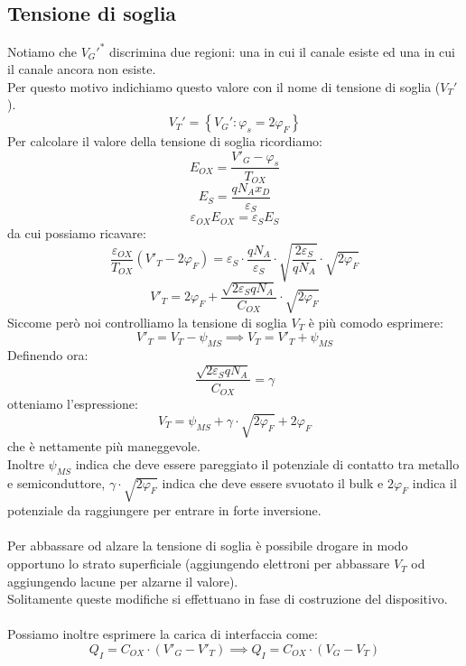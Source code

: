\documentclass[../main.tex]{subfiles}
\begin{document}
	\subsection{Tensione di soglia}
	Notiamo che $V_G'^*$ discrimina due regioni: una in cui il canale esiste ed una in cui il canale ancora non esiste.\\
	Per questo motivo indichiamo questo valore con il nome di tensione di soglia ($V_T'$).
	$$V_T' = \left\{ V_G' : \varphi_s = 2\varphi_F \right\}$$
	Per calcolare il valore della tensione di soglia ricordiamo:
	$$E_{OX} = \frac{V'_G - \varphi_s}{T_{OX}}$$
	$$E_S = \frac{q N_A x_D}{\varepsilon_S}$$
	$$\varepsilon_{OX} E_{OX} = \varepsilon_S E_S$$
	da cui possiamo ricavare:
	$$\frac{\varepsilon_{OX}}{T_{OX}} \left( V'_T - 2\varphi_F \right) = \varepsilon_S \cdot \frac{q N_A}{\varepsilon_S} \cdot \sqrt{\frac{2\varepsilon_S}{q N_A}} \cdot \sqrt{2\varphi_F}$$
	$$V'_T = 2\varphi_F + \frac{\sqrt{2\varepsilon_S q N_A}}{C_{OX}} \cdot \sqrt{2\varphi_F}$$
	Siccome però noi controlliamo la tensione di soglia $V_T$ è più comodo esprimere:
	$$V'_T = V_T - \psi_{MS} \implies V_T = V'_T + \psi_{MS}$$
	Definendo ora:
	$$\frac{\sqrt{2\varepsilon_S q N_A}}{C_{OX}} = \gamma$$
	otteniamo l'espressione:
	$$V_T = \psi_{MS} + \gamma \cdot \sqrt{2\varphi_F} + 2\varphi_F$$
	che è nettamente più maneggevole.\\
	Inoltre $\psi_{MS}$ indica che deve essere pareggiato il potenziale di contatto tra metallo e semiconduttore, $\gamma \cdot \sqrt{2\varphi_F}$ indica che deve essere svuotato il bulk e $2\varphi_F$ indica il potenziale da raggiungere per entrare in forte inversione.\\\\
	Per abbassare od alzare la tensione di soglia è possibile drogare in modo opportuno lo strato superficiale (aggiungendo elettroni per abbassare $V_T$ od aggiungendo lacune per alzarne il valore).\\
	Solitamente queste modifiche si effettuano in fase di costruzione del dispositivo.\\\\
	Possiamo inoltre esprimere la carica di interfaccia come:
	$$Q_I = C_{OX} \cdot \left( V'_G - V'_T \right) \implies Q_I = C_{OX} \cdot (V_G - V_T)$$
\end{document}
